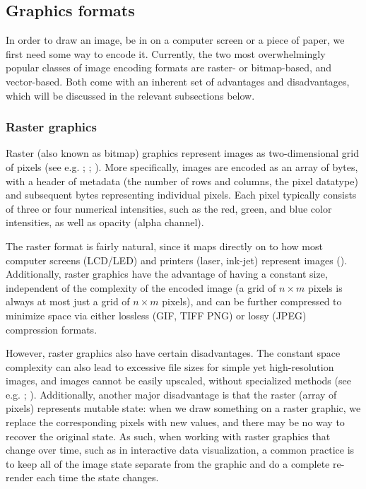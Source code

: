 \documentclass[
  openany]{book}
\theoremstyle{definition}
\theoremstyle{definition}
\theoremstyle{definition}
\theoremstyle{definition}
\theoremstyle{remark}
\begin{document}
\subsection{Graphics formats}\label{graphics-formats}

In order to draw an image, be in on a computer screen or a piece of paper, we first need some way to encode it. Currently, the two most overwhelmingly popular classes of image encoding formats are raster- or bitmap-based, and vector-based. Both come with an inherent set of advantages and disadvantages, which will be discussed in the relevant subsections below.

\subsubsection{Raster graphics}\label{raster-graphics}

Raster (also known as bitmap) graphics represent images as two-dimensional grid of pixels (see e.g. ; ; ). More specifically, images are encoded as an array of bytes, with a header of metadata (the number of rows and columns, the pixel datatype) and subsequent bytes representing individual pixels. Each pixel typically consists of three or four numerical intensities, such as the red, green, and blue color intensities, as well as opacity (alpha channel).

The raster format is fairly natural, since it maps directly on to how most computer screens (LCD/LED) and printers (laser, ink-jet) represent images (). Additionally, raster graphics have the advantage of having a constant size, independent of the complexity of the encoded image (a grid of \(n \times m\) pixels is always at most just a grid of \(n \times m\) pixels), and can be further compressed to minimize space via either lossless (GIF, TIFF PNG) or lossy (JPEG) compression formats.

However, raster graphics also have certain disadvantages. The constant space complexity can also lead to excessive file sizes for simple yet high-resolution images, and images cannot be easily upscaled, without specialized methods (see e.g. ; ). Additionally, another major disadvantage is that the raster (array of pixels) represents mutable state: when we draw something on a raster graphic, we replace the corresponding pixels with new values, and there may be no way to recover the original state. As such, when working with raster graphics that change over time, such as in interactive data visualization, a common practice is to keep all of the image state separate from the graphic and do a complete re-render each time the state changes.
\end{document}

